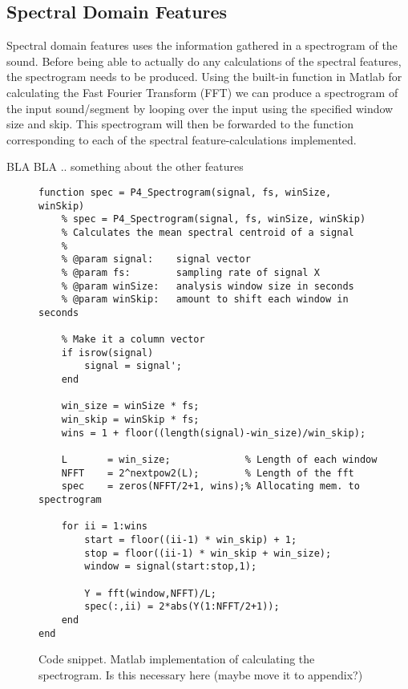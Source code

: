 \subsection{Spectral Domain Features}
Spectral domain features uses the information gathered in a spectrogram of the sound. Before being able to actually do any calculations of the spectral features, the spectrogram needs to be produced. Using the built-in function in Matlab for calculating the Fast Fourier Transform (FFT) we can produce a spectrogram of the input sound/segment by looping over the input using the specified window size and skip. This spectrogram will then be forwarded to the function corresponding to each of the spectral feature-calculations implemented.

BLA BLA .. something about the other features

\begin{figure}
\begin{lstlisting}
function spec = P4_Spectrogram(signal, fs, winSize, winSkip)
    % spec = P4_Spectrogram(signal, fs, winSize, winSkip)
    % Calculates the mean spectral centroid of a signal
    %
    % @param signal:    signal vector
    % @param fs:        sampling rate of signal X
    % @param winSize:   analysis window size in seconds
    % @param winSkip:   amount to shift each window in seconds
    
    % Make it a column vector
    if isrow(signal)
        signal = signal';
    end
    
    win_size = winSize * fs;
    win_skip = winSkip * fs;
    wins = 1 + floor((length(signal)-win_size)/win_skip);
    
    L       = win_size;             % Length of each window
    NFFT    = 2^nextpow2(L);        % Length of the fft
    spec    = zeros(NFFT/2+1, wins);% Allocating mem. to spectrogram
    
    for ii = 1:wins
        start = floor((ii-1) * win_skip) + 1;
        stop = floor((ii-1) * win_skip + win_size);
        window = signal(start:stop,1);
        
        Y = fft(window,NFFT)/L;
        spec(:,ii) = 2*abs(Y(1:NFFT/2+1));
    end
end
\end{lstlisting}
\caption{Code snippet. Matlab implementation of calculating the spectrogram. Is this necessary here (maybe move it to appendix?)}
\label{snippet-spectrogram}
\end{figure}